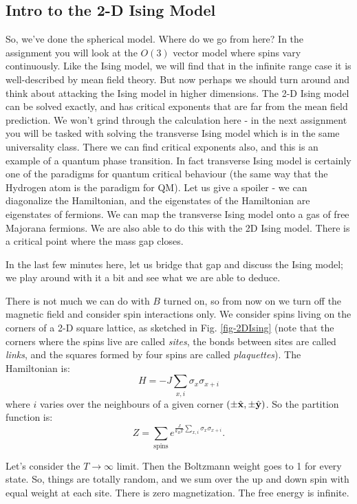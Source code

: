 \subsection{Intro to the 2-D Ising Model}
So, we've done the spherical model. Where do we go from here? In the assignment you will look at the $O(3)$ vector model where spins vary continuously. Like the Ising model, we will find that in the infinite range case it is well-described by mean field theory. But now perhaps we should turn around and think about attacking the Ising model in higher dimensions. The 2-D Ising model can be solved exactly, and has critical exponents that are far from the mean field prediction. We won't grind through the calculation here - in the next assignment you will be tasked with solving the transverse Ising model which is in the same universality class. There we can find critical exponents also, and this is an example of a quantum phase transition. In fact transverse Ising model is certainly one of the paradigms for quantum critical behaviour (the same way that the Hydrogen atom is the paradigm for QM). Let us give a spoiler - we can diagonalize the Hamiltonian, and the eigenstates of the Hamiltonian are eigenstates of fermions. We can map the transverse Ising model onto a gas of free Majorana fermions. We are also able to do this with the 2D Ising model. There is a critical point where the mass gap closes.

In the last few minutes here, let us bridge that gap and discuss the Ising model; we play around with it a bit and see what we are able to deduce.

There is not much we can do with $B$ turned on, so from now on we turn off the magnetic field and consider spin interactions only. We consider spins living on the corners of a 2-D square lattice, as sketched in Fig. \ref{fig-2DIsing} (note that the corners where the spins live are called \emph{sites}, the bonds between sites are called \emph{links}, and the squares formed by four spins are called \emph{plaquettes}). The Hamiltonian is:
\begin{equation}
    H = -J\sum_{x, i}\sigma_x \sigma_{x + i}
\end{equation}
where $i$ varies over the neighbours of a given corner $(\pm \hat{\mathbf{x}}, \pm \hat{\mathbf{y}})$. So the partition function is:
\begin{equation}
    Z = \sum_{\text{spins}}e^{\frac{J}{k_B T}\sum_{x, i}\sigma_x \sigma_{x + i}}.
\end{equation}

Let's consider the $T \to \infty$ limit. Then the Boltzmann weight goes to 1 for every state. So, things are totally random, and we sum over the up and down spin with equal weight at each site. There is zero magnetization. The free energy is infinite.

